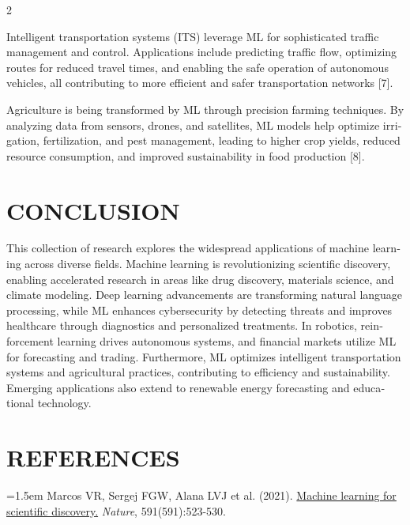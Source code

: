 \documentclass[a4paper,10pt,twoside]{article}
\newcommand{\citationfont}{\fontsize{8}{11}\selectfont}
\begin{document}
\begin{multicols}{2}
\begin{otherlanguage}{english}
Intelligent transportation systems (ITS) leverage ML for sophisticated traffic management and control. Applications include predicting traffic flow, optimizing routes for reduced travel times, and enabling the safe operation of autonomous vehicles, all contributing to more efficient and safer transportation networks [7].

Agriculture is being transformed by ML through precision farming techniques. By analyzing data from sensors, drones, and satellites, ML models help optimize irrigation, fertilization, and pest management, leading to higher crop yields, reduced resource consumption, and improved sustainability in food production [8].
    \end{otherlanguage}

    \vspace{0.4em}

    \section*{CONCLUSION}
    \begin{otherlanguage}{english}
    This collection of research explores the widespread applications of machine learning across diverse fields. Machine learning is revolutionizing scientific discovery, enabling accelerated research in areas like drug discovery, materials science, and climate modeling. Deep learning advancements are transforming natural language processing, while ML enhances cybersecurity by detecting threats and improves healthcare through diagnostics and personalized treatments. In robotics, reinforcement learning drives autonomous systems, and financial markets utilize ML for forecasting and trading. Furthermore, ML optimizes intelligent transportation systems and agricultural practices, contributing to efficiency and sustainability. Emerging applications also extend to renewable energy forecasting and educational technology.
    \end{otherlanguage}

    \vspace{0.4em}

    \section*{REFERENCES}
    {\citationfont
                \noindent\hangindent=1.5em
                    Marcos VR, Sergej FGW, Alana LVJ et al.
                (2021).
                    \href{https://pubmed.ncbi.nlm.nih.gov/33753790/}{Machine learning for scientific discovery.}
                \textit{Nature},
                    591(591):523-530.
                \par\vspace{3pt}

}
\end{multicols}
\end{document}
